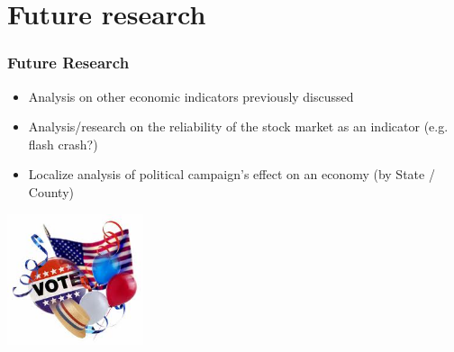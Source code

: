 \documentclass[compress,handout,10pt]{beamer}
\let\olditem\item
\renewcommand{\item}{\setlength{\itemsep}{0.5\baselineskip}\olditem}
\begin{document}
\section{Future research}
\begin{frame}
    \frametitle{Future Research}

\begin{itemize}
    \item Analysis on other economic indicators previously discussed
    \item Analysis/research on the reliability of the stock market as an indicator (e.g. flash crash?)
	\item Localize analysis of political campaign's effect on an economy (by State / County)
\end{itemize}
\begin{center}
            \includegraphics[width=0.3\textwidth]{images/campaign.jpeg}
\end{center}
\end{frame}
\end{document}
